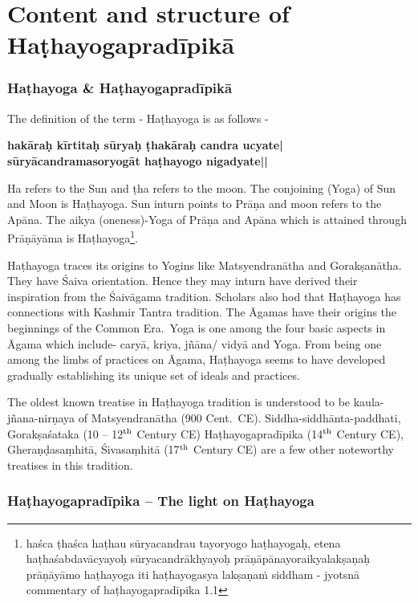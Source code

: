 \part{Content and structure of Haṭhayogapradīpikā}


\section*{Haṭhayoga \&  Haṭhayogapradīpikā}

The definition of the term - Haṭhayoga is as follows -

\begin{shloka}
\textbf{hakāraḥ kīrtitaḥ sūryaḥ ṭhakāraḥ candra ucyate|}\\
\textbf{sūryācandramasoryogāt haṭhayogo nigadyate||}

\end{shloka}

Ha refers to the Sun and ṭha refers to the moon. The conjoining (Yoga) of Sun and Moon is Haṭhayoga. Sun inturn points to Prāṇa and moon refers to the Apāna. The aikya (oneness)-Yoga of Prāṇa and Apāna which is attained through Prāṇāyāma is Haṭhayoga\footnote{haśca ṭhaśca haṭhau sūryacandrau tayoryogo haṭhayogaḥ, etena haṭhaśabdavācyayoḥ sūryacandrākhyayoḥ prāṇāpānayoraikyalakṣaṇaḥ prāṇāyāmo haṭhayoga iti haṭhayogasya lakṣaṇaṁ siddham  - jyotsnā commentary of haṭhayogapradīpika 1.1}.

Haṭhayoga traces its origins to Yogins like Matsyendranātha and Gorakṣanātha. They have Śaiva orientation. Hence they may inturn have derived their inspiration from the Śaivāgama tradition. Scholars also hod that Haṭhayoga has connections with Kashmir Tantra tradition.  The Āgamas have their origins the beginnings of the Common Era.\ Yoga is one among the four basic aspects in Āgama which include- caryā, kriya, jñāna/ vidyā and Yoga. From being one among the limbs of practices on Āgama, Haṭhayoga seems to have developed gradually establishing its unique set of ideals and practices.

The oldest known treatise in Haṭhayoga tradition is understood to be kaula-jñana-nirṇaya of Matsyendranātha (900 Cent.\ CE). Siddha-\break siddhānta-paddhati, Gorakṣaśataka (10 -- 12$^{\rm th}$ Century CE) Haṭha\-yoga\-pra\-dī\-pika (14$^{\rm th}$ Century CE), Gheraṇḍasaṃhitā, Śivasaṃhitā (17$^{\rm th}$ Century CE) are a few other noteworthy treatises in this tradition.

\section*{Haṭhayogapradīpika – The light on Haṭhayoga}

